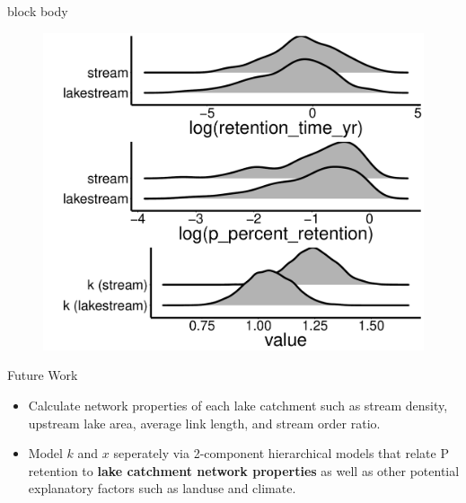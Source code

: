 \documentclass[final,hyperref={pdfpagelabels=false}]{beamer}
\begin{document}
\begin{frame}[t]
\begin{columns}[t]
\begin{column}{.465\textwidth}
{\begin{beamercolorbox}[wd=\textwidth,rounded=true]{block body}
\begin{figure}
  \includegraphics[width=30cm]{gleon_poster.pdf}
\end{figure}

\end{beamercolorbox}
}



\vspace{1em}


\begin{block}{Future Work}

\begin{itemize}
\item Calculate network properties of each lake catchment such as stream density, upstream lake area, average link length, and stream order ratio.
\vspace{1em}
\item Model $k$ and $x$ seperately via 2-component hierarchical models that relate P retention to \textbf{lake catchment network properties} as well as other potential explanatory factors such as landuse and climate.
\end{itemize}
\end{block}




\end{column}
\end{columns}
\end{frame}
\end{document}
